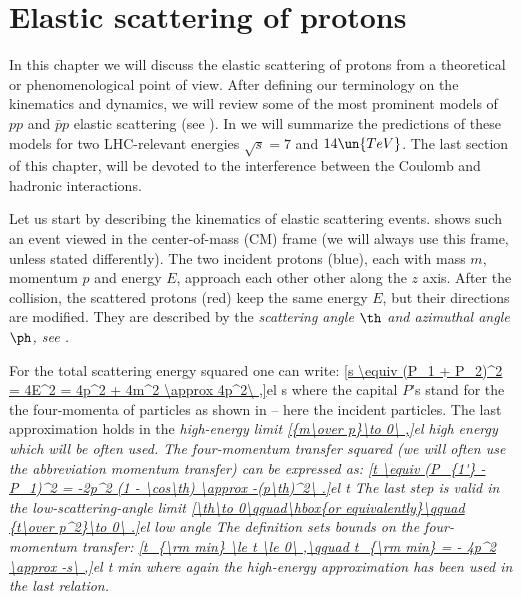 \def\FC{F^{\rm C}}
\def\FH{F^{\rm H}}
\def\FCH{F^{\rm C+H}}

\def\KL{Kundr\' at-Lokaj\char237\char232 ek}
\def\KaL{Kundr\' at and Lokaj\char237\char232 ek}
\def\WY{West-Yennie}
\def\WaY{West and Yennie}


\iffalse
CM, QCD, QFT, LHC, BFKL, HP, LxG, RMS, QED, QM, OPE, TPE, IR, KL, CKL, WY, SWY
ATLAS ALFA, TDR
\fi

\chapter[el]{Elastic scattering of protons}

In this chapter we will discuss the elastic scattering of protons from a theoretical or phenomenological point of view. After defining our terminology on the kinematics and dynamics, we will review some of the most prominent models of $pp$ and $\bar pp$ elastic scattering (see ). In  we will summarize the predictions of these models for two LHC-relevant energies $\sqrt s = 7$ and $14\un{TeV}$. The last section of this chapter,  will be devoted to the interference between the Coulomb and hadronic interactions.

Let us start by describing the kinematics of elastic scattering events.  shows such an event viewed in the center-of-mass (CM) frame (we will always use this frame, unless stated differently). The two incident protons (blue), each with mass $m$, momentum $p$ and energy $E$, approach each other other along the $z$ axis. After the collision, the scattered protons (red) keep the same energy $E$, but their directions are modified. They are described by the \em{scattering angle} $\th$ and \em{azimuthal angle} $\ph$, see .


For the total scattering energy squared one can write:
\eqref{s \equiv (P_1 + P_2)^2 = 4E^2 = 4p^2 + 4m^2 \approx 4p^2\ ,}{el s}
where the capital $P$'s stand for the the four-momenta of particles as shown in  -- here the incident particles. The last approximation holds in the \em{high-energy} limit
\eqref{{m\over p}\to 0\ ,}{el high energy}
which will be often used. The four-momentum transfer squared (we will often use the abbreviation momentum transfer) can be expressed as:
\eqref{t \equiv (P_{1'} - P_1)^2 = -2p^2 (1 - \cos\th) \approx -(p\th)^2\ .}{el t}
The last step is valid in the \em{low-scattering-angle} limit
\eqref{\th\to 0\qquad\hbox{or equivalently}\qquad {t\over p^2}\to 0\ .}{el low angle}
The definition  sets bounds on the four-momentum transfer:
\eqref{t_{\rm min} \le t \le 0\ ,\qquad t_{\rm min} = - 4p^2 \approx -s\ ,}{el t min}
where again the high-energy approximation has been used in the last relation.

